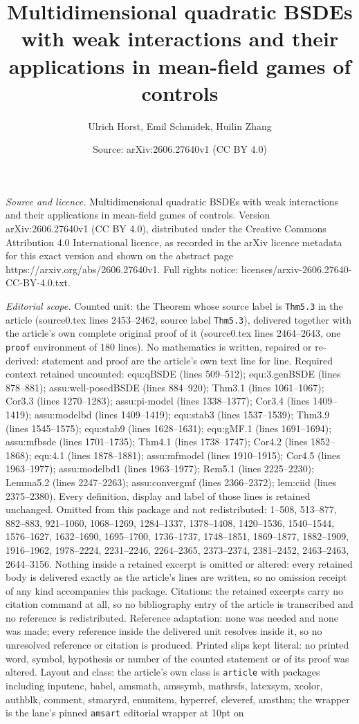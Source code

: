 \documentclass[10pt,a4paper]{amsart}
\title[Multidimensional quadratic BSDEs with weak interactions and ]{Multidimensional quadratic BSDEs with weak interactions and their applications in mean-field games of controls}
\author{Ulrich Horst, Emil Schmidek, Huilin Zhang}
\date{Source: arXiv:2606.27640v1 (CC BY 4.0)}
\begin{document}
\maketitle

\noindent\emph{Source and licence.} Multidimensional quadratic BSDEs with weak interactions and their applications in mean-field games of controls. Version arXiv:2606.27640v1 (CC BY 4.0), distributed under the Creative Commons Attribution 4.0 International licence, as recorded in the arXiv licence metadata for this exact version and shown on the abstract page https://arxiv.org/abs/2606.27640v1. Full rights notice: licenses/arxiv-2606.27640-CC-BY-4.0.txt.\par\smallskip

\noindent\textit{Editorial scope.} Counted unit: the Theorem whose source label is \texttt{Thm5.3} in the article (source0.tex lines 2453--2462, source label \texttt{Thm5.3}), delivered together with the article's own complete original proof of it (source0.tex lines 2464--2643, one \texttt{proof} environment of 180 lines). No mathematics is written, repaired or re-derived: statement and proof are the article's own text line for line. Required context retained uncounted: equ:qBSDE (lines 509--512); equ:3.genBSDE (lines 878--881); assu:well-posedBSDE (lines 884--920); Thm3.1 (lines 1061--1067); Cor3.3 (lines 1270--1283); assu:pi-model (lines 1338--1377); Cor3.4 (lines 1409--1419); assu:modelbd (lines 1409--1419); equ:stab3 (lines 1537--1539); Thm3.9 (lines 1545--1575); equ:stab9 (lines 1628--1631); equ:gMF.1 (lines 1691--1694); assu:mfbsde (lines 1701--1735); Thm4.1 (lines 1738--1747); Cor4.2 (lines 1852--1868); equ:4.1 (lines 1878--1881); assu:mfmodel (lines 1910--1915); Cor4.5 (lines 1963--1977); assu:modelbd1 (lines 1963--1977); Rem5.1 (lines 2225--2230); Lemma5.2 (lines 2247--2263); assu:convergmf (lines 2366--2372); lem:ciid (lines 2375--2380). Every definition, display and label of those lines is retained unchanged. Omitted from this package and not redistributed: 1--508, 513--877, 882--883, 921--1060, 1068--1269, 1284--1337, 1378--1408, 1420--1536, 1540--1544, 1576--1627, 1632--1690, 1695--1700, 1736--1737, 1748--1851, 1869--1877, 1882--1909, 1916--1962, 1978--2224, 2231--2246, 2264--2365, 2373--2374, 2381--2452, 2463--2463, 2644--3156. Nothing inside a retained excerpt is omitted or altered: every retained body is delivered exactly as the article's lines are written, so no omission receipt of any kind accompanies this package. Citations: the retained excerpts carry no citation command at all, so no bibliography entry of the article is transcribed and no reference is redistributed. Reference adaptation: none was needed and none was made; every reference inside the delivered unit resolves inside it, so no unresolved reference or citation is produced. Printed slips kept literal: no printed word, symbol, hypothesis or number of the counted statement or of its proof was altered. Layout and class: the article's own class is \texttt{article} with packages including inputenc, babel, amsmath, amssymb, mathrsfs, latexsym, xcolor, authblk, comment, stmaryrd, enumitem, hyperref, cleveref, amsthm; the wrapper is the lane's pinned \texttt{amsart} editorial wrapper at 10pt on 
\end{document}
